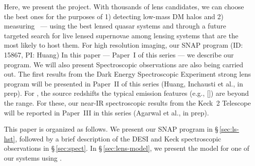 Here, we present the \projname project. 
With thousands of lens candidates, we can choose the best ones for the purposes of 1) detecting low-mass DM halos and 2) measuring \ho\ --- using the best lensed quasar systems and through a future targeted search for live lensed supernovae among lensing systems that are the most likely to host them.
For high resolution imaging, 
our \HST SNAP program (ID: 15867, PI: Huang) 
In this paper --- Paper~I of this series --- 
we describe our \hst program.  
We will also present 
Spectroscopic observations are also being carried out.
The first  results from the Dark Energy Spectroscopic Experiment \citep[DESI;][]{desi2016a, desi2016b} strong lens program  will be presented in Paper~II of this series (Huang, Inchausti et al., in prep).
For 
, the source redshifts  the typical emission features (e.g., []) are beyond the  range.
For these, our near-IR spectroscopic results from the Keck~2 Telescope will be reported in Paper~III in this series (Agarwal et al., in prep).


This paper is organized as follows.  
We present our \HST SNAP program in   
\S\,\ref{sec:ls-hst}, followed by a brief description of the 
DESI and Keck spectroscopic observations in \S\,\ref{sec:spect}.
In \S\,\ref{sec:lens-model}, we present the model for one of our \hst systems using \gigal. 



